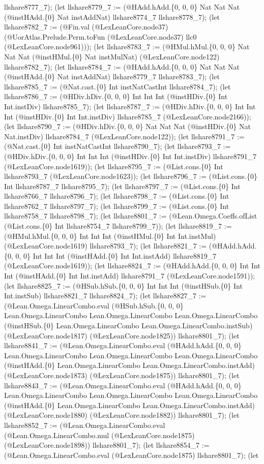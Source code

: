 \documentclass[11pt]{article}
\begin{document}
llshare8777\_7); (let llshare8779\_7 := (@HAdd.hAdd.\{0, 0, 0\} Nat Nat Nat (@instHAdd.\{0\} Nat instAddNat) llshare8774\_7 llshare8778\_7); (let llshare8782\_7 := (@Fin.val (@LexLeanCore.node37) (@UorAtlas.Prelude.Perm.toFun (@LexLeanCore.node37) llc0 (@LexLeanCore.node961))); (let llshare8783\_7 := (@HMul.hMul.\{0, 0, 0\} Nat Nat Nat (@instHMul.\{0\} Nat instMulNat) (@LexLeanCore.node122) llshare8782\_7); (let llshare8784\_7 := (@HAdd.hAdd.\{0, 0, 0\} Nat Nat Nat (@instHAdd.\{0\} Nat instAddNat) llshare8779\_7 llshare8783\_7); (let llshare8785\_7 := (@Nat.cast.\{0\} Int instNatCastInt llshare8784\_7); (let llshare8786\_7 := (@HDiv.hDiv.\{0, 0, 0\} Int Int Int (@instHDiv.\{0\} Int Int.instDiv) llshare8785\_7); (let llshare8787\_7 := (@HDiv.hDiv.\{0, 0, 0\} Int Int Int (@instHDiv.\{0\} Int Int.instDiv) llshare8785\_7 (@LexLeanCore.node2166)); (let llshare8790\_7 := (@HDiv.hDiv.\{0, 0, 0\} Nat Nat Nat (@instHDiv.\{0\} Nat Nat.instDiv) llshare8784\_7 (@LexLeanCore.node122)); (let llshare8791\_7 := (@Nat.cast.\{0\} Int instNatCastInt llshare8790\_7); (let llshare8793\_7 := (@HDiv.hDiv.\{0, 0, 0\} Int Int Int (@instHDiv.\{0\} Int Int.instDiv) llshare8791\_7 (@LexLeanCore.node1619)); (let llshare8795\_7 := (@List.cons.\{0\} Int llshare8793\_7 (@LexLeanCore.node1623)); (let llshare8796\_7 := (@List.cons.\{0\} Int llshare8787\_7 llshare8795\_7); (let llshare8797\_7 := (@List.cons.\{0\} Int llshare8766\_7 llshare8796\_7); (let llshare8798\_7 := (@List.cons.\{0\} Int llshare8762\_7 llshare8797\_7); (let llshare8799\_7 := (@List.cons.\{0\} Int llshare8758\_7 llshare8798\_7); (let llshare8801\_7 := (@Lean.Omega.Coeffs.ofList (@List.cons.\{0\} Int llshare8754\_7 llshare8799\_7)); (let llshare8819\_7 := (@HMul.hMul.\{0, 0, 0\} Int Int Int (@instHMul.\{0\} Int Int.instMul) (@LexLeanCore.node1619) llshare8793\_7); (let llshare8821\_7 := (@HAdd.hAdd.\{0, 0, 0\} Int Int Int (@instHAdd.\{0\} Int Int.instAdd) llshare8819\_7 (@LexLeanCore.node1619)); (let llshare8824\_7 := (@HAdd.hAdd.\{0, 0, 0\} Int Int Int (@instHAdd.\{0\} Int Int.instAdd) llshare8791\_7 (@LexLeanCore.node1591)); (let llshare8825\_7 := (@HSub.hSub.\{0, 0, 0\} Int Int Int (@instHSub.\{0\} Int Int.instSub) llshare8821\_7 llshare8824\_7); (let llshare8827\_7 := (@Lean.Omega.LinearCombo.eval (@HSub.hSub.\{0, 0, 0\} Lean.Omega.LinearCombo Lean.Omega.LinearCombo Lean.Omega.LinearCombo (@instHSub.\{0\} Lean.Omega.LinearCombo Lean.Omega.LinearCombo.instSub) (@LexLeanCore.node1817) (@LexLeanCore.node1825)) llshare8801\_7); (let llshare8841\_7 := (@Lean.Omega.LinearCombo.eval (@HAdd.hAdd.\{0, 0, 0\} Lean.Omega.LinearCombo Lean.Omega.LinearCombo Lean.Omega.LinearCombo (@instHAdd.\{0\} Lean.Omega.LinearCombo Lean.Omega.LinearCombo.instAdd) (@LexLeanCore.node1873) (@LexLeanCore.node1875)) llshare8801\_7); (let llshare8843\_7 := (@Lean.Omega.LinearCombo.eval (@HAdd.hAdd.\{0, 0, 0\} Lean.Omega.LinearCombo Lean.Omega.LinearCombo Lean.Omega.LinearCombo (@instHAdd.\{0\} Lean.Omega.LinearCombo Lean.Omega.LinearCombo.instAdd) (@LexLeanCore.node1880) (@LexLeanCore.node1882)) llshare8801\_7); (let llshare8852\_7 := (@Lean.Omega.LinearCombo.eval (@Lean.Omega.LinearCombo.mul (@LexLeanCore.node1875) (@LexLeanCore.node1898)) llshare8801\_7); (let llshare8854\_7 := (@Lean.Omega.LinearCombo.eval (@LexLeanCore.node1875) llshare8801\_7); (let 
\end{document}

